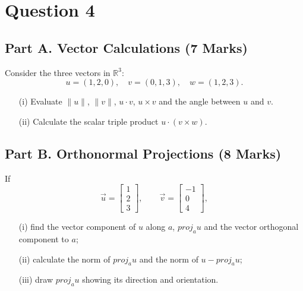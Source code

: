 \documentclass[a4paper,12pt]{article}
\begin{document}
\newpage
\section*{Question 4}
	\subsection*{Part A. Vector Calculations (7 Marks)}
	Consider the three vectors in $\mathbb{R}^3$:
	$$
	u = (1, 2, 0), \quad v = (0, 1, 3),\quad w = (1, 2, 3).
	$$
		\begin{itemize}
			\item[(i)] Evaluate $\|u\|$, $\|v\|$, $u\cdot v$, $u\times v$ and the angle between $u$ and $v$. %
		
		\medskip\item[(ii)] Calculate the scalar triple product  $u\cdot(v \times w)$.%
	\end{itemize}
	
	
	\subsection*{Part B. Orthonormal Projections (8 Marks)}
	If
	\begin{equation*}
	\vec{u}=\left[ \begin{array}{c} 1 \\ 2 \\ 3 \end{array}\right],\qquad 
	\vec{v}=\left[ \begin{array}{c} -1 \\ 0 \\ 4 \end{array}\right],
	\end{equation*}
	
\begin{itemize}
	\item[(i)]  find the vector component of $u$ along $a$, $proj_{a}u$ and the
	vector orthogonal component to $a$;
	
	\item[(ii)]   calculate the norm of $proj_a u$ and the norm of $u-proj_a u$;
	
	\item[(iii)]   draw $proj_a u$ showing its direction and orientation.
		\end{itemize}
\end{document}

